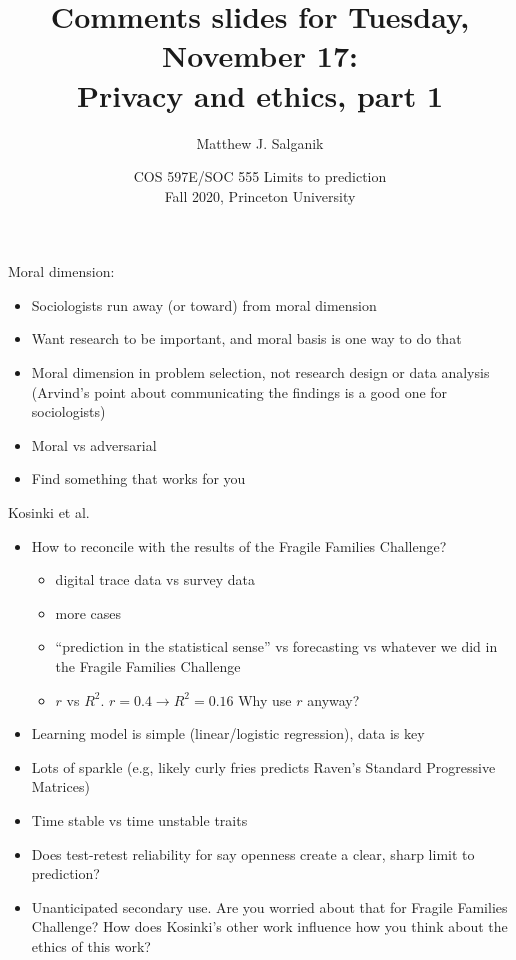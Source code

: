 \documentclass[aspectratio=169]{beamer}
\title[]{Comments slides for Tuesday, November 17:\\Privacy and ethics, part 1}
\author[]{Matthew J. Salganik}
\institute[]{}
\date[]{COS 597E/SOC 555 Limits to prediction\\Fall 2020, Princeton University}
\begin{document}
\frame{\titlepage}
\begin{frame}

Moral dimension:
\begin{itemize}
\item Sociologists run away (or toward) from moral dimension
\pause
\item Want research to be important, and moral basis is one way to do that
\pause
\item Moral dimension in problem selection, not research design or data analysis (Arvind's point about communicating the findings is a good one for sociologists)
\pause
\item Moral vs adversarial 
\pause
\item Find something that works for you
\end{itemize}

\end{frame}
\begin{frame}

Kosinki et al.\
\begin{itemize}
\item How to reconcile with the results of the Fragile Families Challenge?
\begin{itemize}
\item digital trace data vs survey data
\pause
\item more cases
\pause
\item ``prediction in the statistical sense'' vs forecasting vs whatever we did in the Fragile Families Challenge
\pause
\item $r$ vs $R^2$. $r = 0.4 \rightarrow R^2 = 0.16$ \pause Why use $r$ anyway?
\end{itemize}
\pause
\item Learning model is simple (linear/logistic regression), data is key
\pause
\item Lots of sparkle (e.g, likely curly fries predicts Raven's Standard Progressive Matrices)
\pause
\item Time stable vs time unstable traits
\pause
\item Does test-retest reliability for say openness create a clear, sharp limit to prediction?
\pause
\item Unanticipated secondary use. \pause Are you worried about that for Fragile Families Challenge? \pause How does Kosinki's other work influence how you think about the ethics of this work?
\end{itemize}

\end{frame}
\end{document}
